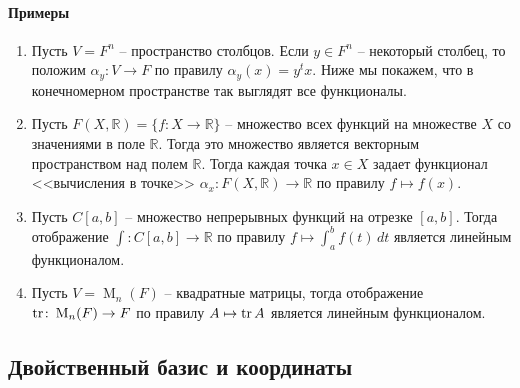 \paragraph{Примеры}

\begin{enumerate}
\item Пусть $V = F^n$ -- пространство столбцов.
Если $y\in F^n$ -- некоторый столбец, то положим $\alpha_y \colon V\to F$ по правилу $\alpha_y(x) = y^t x$.
Ниже мы покажем, что в конечномерном пространстве так выглядят все функционалы.

\item Пусть $F(X, \mathbb R) = \{f\colon X\to \mathbb R\}$ -- множество всех функций на множестве $X$ со значениями в поле $\mathbb R$.
Тогда это множество является векторным пространством над полем $\mathbb R$.
Тогда каждая точка $x\in X$ задает функционал <<вычисления в точке>> $\alpha_x \colon F(X,\mathbb R)\to \mathbb R$ по правилу $f\mapsto f(x)$.

\item Пусть $C[a,b]$ -- множество непрерывных функций на отрезке $[a,b]$.
Тогда отображение $\int \colon C[a,b]\to \mathbb R$ по правилу $f \mapsto \int_a^b f(t)\,dt$ является линейным функционалом.

\item Пусть $V = \operatorname{M}_n(F)$ -- квадратные матрицы, тогда отображение $\operatorname{tr}\colon \operatorname{M}_n(F)\to F$ по правилу $A\mapsto \operatorname{tr} A$ является линейным функционалом.
\end{enumerate}

\subsection{Двойственный базис и координаты}

